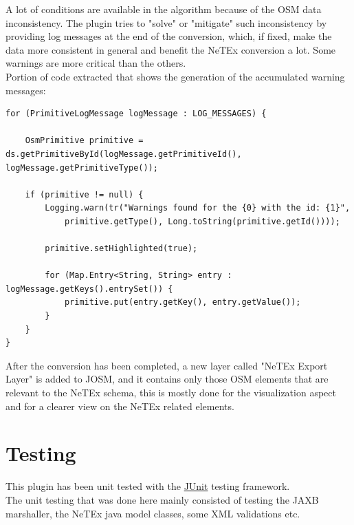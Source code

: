 A lot of conditions are available in the algorithm because of the OSM data inconsistency. The plugin tries to "solve" or "mitigate" such inconsistency by providing log messages at the end of the conversion, which, if fixed, make the data more consistent in general and benefit the NeTEx conversion a lot. Some warnings are more critical than the others.\\
\newpage
Portion of code extracted that shows the generation of the accumulated warning messages:
\begin{verbatim}
for (PrimitiveLogMessage logMessage : LOG_MESSAGES) {

	OsmPrimitive primitive = ds.getPrimitiveById(logMessage.getPrimitiveId(), logMessage.getPrimitiveType());

	if (primitive != null) {
		Logging.warn(tr("Warnings found for the {0} with the id: {1}",
			primitive.getType(), Long.toString(primitive.getId())));

		primitive.setHighlighted(true);

		for (Map.Entry<String, String> entry : logMessage.getKeys().entrySet()) {
			primitive.put(entry.getKey(), entry.getValue());
		}
	}
}
\end{verbatim}
After the conversion has been completed, a new layer called "NeTEx Export Layer" is added to JOSM, and it contains only those OSM elements that are relevant to the NeTEx schema, this is mostly done for the visualization aspect and for a clearer view on the NeTEx related elements.\\
\newpage
\section{Testing}
This plugin has been unit tested with the \href{https://junit.org/junit5/}{JUnit} testing framework.\\
The unit testing that was done here mainly consisted of testing the JAXB marshaller, the NeTEx java model classes, some XML validations etc.

